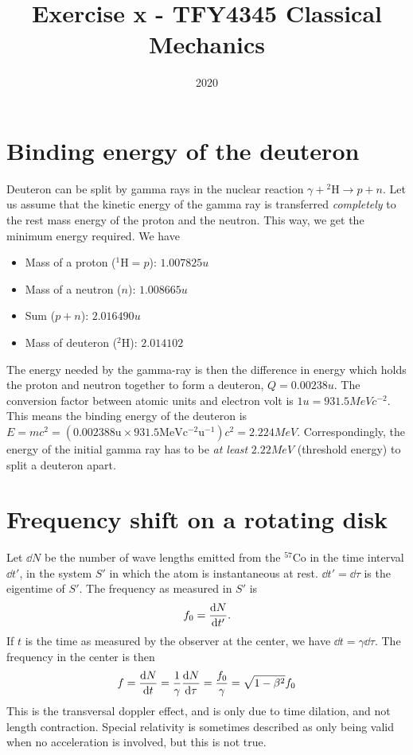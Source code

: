 \documentclass{article}
\title{Exercise x - TFY4345 Classical Mechanics}
\date{2020}
\begin{document}
    \maketitle
    \section{Binding energy of the deuteron}
        Deuteron can be split by gamma rays in the nuclear reaction $\gamma + {^2\mathrm{H}} \rightarrow p + n$. Let us assume that the kinetic energy of the gamma ray is transferred \emph{completely} to the rest mass energy of the proton and the neutron. This way, we get the minimum energy required. We have
        \begin{itemize}
            \item Mass of a proton ($^1\mathrm{H} = p$): $1.007825 \si{u}$
            \item Mass of a neutron ($n$): $1.008665 \si{u}$
            \item Sum ($p + n$): $2.016490 \si{u}$
            \item Mass of deuteron ($^2 \mathrm{H}$): $2.014102$
        \end{itemize}
        The energy needed by the gamma-ray is then the difference in energy which holds the proton and neutron together to form a deuteron, $Q=0.00238 \si{u}$. The conversion factor between atomic units and electron volt is $1 \si{u} = 931.5 \si{MeV c^{-2}}$. This means the binding energy of the deuteron is $E = mc^2 = (0.002388 \mathrm{u} \times 931.5 \mathrm{MeV c^{-2} u^{-1}})c^2 = 2.224 \si{MeV}$. Correspondingly, the energy of the initial gamma ray has to be \emph{at least} $2.22\si{MeV}$ (threshold energy) to split a deuteron apart.

    \section{Frequency shift on a rotating disk}
        Let $\dd N$ be the number of wave lengths emitted from the $^{57}\mathrm{Co}$ in the time interval $\dd t'$, in the system $S'$ in which the atom is instantaneous at rest. $\dd t' = \dd \tau$ is the eigentime of $S'$. The frequency as measured in $S'$ is
        \begin{equation*}
            f_0 = \dv{N}{t'}.
        \end{equation*}
        If $t$ is the time as measured by the observer at the center, we have $\dd t = \gamma \dd \tau$. The frequency in the center is then
        \begin{equation}
            f = \dv{N}{t} = \frac{1}{\gamma} \dv{N}{\tau} = \frac{f_0}{\gamma} = \sqrt{1 - \beta^2}f_0
        \end{equation}
        This is the transversal doppler effect, and is only due to time dilation, and not length contraction. Special relativity is sometimes described as only being valid when no acceleration is involved, but this is not true. 
\end{document}
